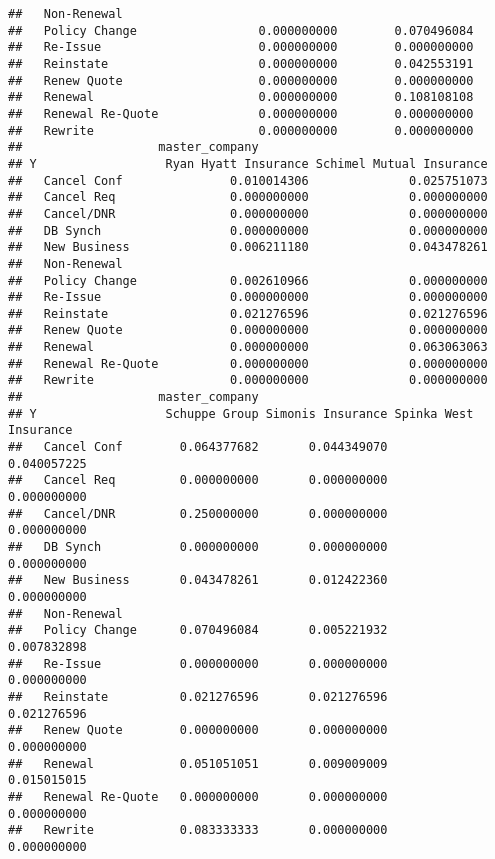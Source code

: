 \documentclass[]{article}
\begin{document}
\begin{verbatim}
##   Non-Renewal                                                 
##   Policy Change                 0.000000000        0.070496084
##   Re-Issue                      0.000000000        0.000000000
##   Reinstate                     0.000000000        0.042553191
##   Renew Quote                   0.000000000        0.000000000
##   Renewal                       0.000000000        0.108108108
##   Renewal Re-Quote              0.000000000        0.000000000
##   Rewrite                       0.000000000        0.000000000
##                   master_company
## Y                  Ryan Hyatt Insurance Schimel Mutual Insurance
##   Cancel Conf               0.010014306              0.025751073
##   Cancel Req                0.000000000              0.000000000
##   Cancel/DNR                0.000000000              0.000000000
##   DB Synch                  0.000000000              0.000000000
##   New Business              0.006211180              0.043478261
##   Non-Renewal                                                   
##   Policy Change             0.002610966              0.000000000
##   Re-Issue                  0.000000000              0.000000000
##   Reinstate                 0.021276596              0.021276596
##   Renew Quote               0.000000000              0.000000000
##   Renewal                   0.000000000              0.063063063
##   Renewal Re-Quote          0.000000000              0.000000000
##   Rewrite                   0.000000000              0.000000000
##                   master_company
## Y                  Schuppe Group Simonis Insurance Spinka West Insurance
##   Cancel Conf        0.064377682       0.044349070           0.040057225
##   Cancel Req         0.000000000       0.000000000           0.000000000
##   Cancel/DNR         0.250000000       0.000000000           0.000000000
##   DB Synch           0.000000000       0.000000000           0.000000000
##   New Business       0.043478261       0.012422360           0.000000000
##   Non-Renewal                                                           
##   Policy Change      0.070496084       0.005221932           0.007832898
##   Re-Issue           0.000000000       0.000000000           0.000000000
##   Reinstate          0.021276596       0.021276596           0.021276596
##   Renew Quote        0.000000000       0.000000000           0.000000000
##   Renewal            0.051051051       0.009009009           0.015015015
##   Renewal Re-Quote   0.000000000       0.000000000           0.000000000
##   Rewrite            0.083333333       0.000000000           0.000000000

\end{verbatim}
\end{document}
